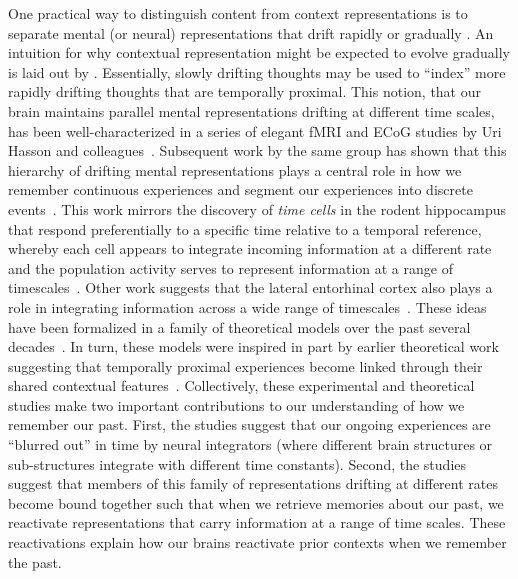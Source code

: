 \documentclass{article}
\begin{document}
One practical way to distinguish content from context representations is to separate mental (or neural) representations that drift rapidly \citep[content;][]{PolyEtal05, MannEtal12} or gradually \citep[context;][]{PolyEtal05, MannEtal11, HowaEtal12, LohnEtal18, LongKaha18, FolkEtal18}.  An intuition for why contextual representation might be expected to evolve gradually is laid out by \cite{PolyKaha08}.  Essentially, slowly drifting thoughts may be used to ``index'' more rapidly drifting thoughts that are temporally proximal.  This notion, that our brain maintains parallel mental representations drifting at different time scales, has been well-characterized in a series of elegant fMRI and ECoG studies by Uri Hasson and colleagues~\citep{HassEtal08, LernEtal11, HoneEtal12, AlyEtal18}.  Subsequent work by the same group has shown that this hierarchy of drifting mental representations plays a central role in how we remember continuous experiences and segment our experiences into discrete events~\citep{BaldEtal17}. This work mirrors the discovery of \textit{time cells} in the rodent hippocampus that respond preferentially to a specific time relative to a temporal reference, whereby each cell appears to integrate incoming information at a different rate~\citep{PastEtal08, MacDEtal11} and the population activity serves to represent information at a range of timescales~\citep{MauEtal18}. Other work suggests that the lateral entorhinal cortex also plays a role in integrating information across a wide range of timescales~\citep{TsaoEtal18}.  These ideas have been formalized in a family of theoretical models over the past several decades~\citep{HowaKaha02, DianEtal07, SedeEtal08, PolyEtal09, ShanEtal09, ShanHowa10, ShanHowa12, HowaEtal14, Rang18}.  In turn, these models were inspired in part by earlier theoretical work suggesting that temporally proximal experiences become linked through their shared contextual features~\citep{Este55a,AtkiShif68}.  Collectively, these experimental and theoretical studies make two important contributions to our understanding of how we remember our past.  First, the studies suggest that our ongoing experiences are ``blurred out'' in time by neural integrators (where different brain structures or sub-structures integrate with different time constants).  Second, the studies suggest that members of this family of representations drifting at different rates become bound together such that when we retrieve memories about our past, we reactivate representations that carry information at a range of time scales.  These reactivations explain how our brains reactivate prior contexts when we remember the past.
\end{document}
